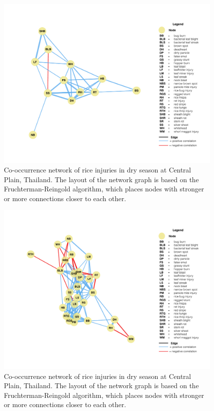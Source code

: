 \begin{figure}
    \centering
        \includegraphics[width = 1\textwidth]{figures/fullnetwork_TMws.pdf}
        \caption{Co-occurrence network of rice injuries in dry season at Central Plain, Thailand. The layout of the network graph is based on the Fruchterman-Reingold algorithm, which places nodes with stronger or more connections closer to each other.}
        \label{fig:}
    \end{figure}

\begin{figure}
    \centering
        \includegraphics[width = 1\textwidth]{figures/fullnetwork_WJds.pdf}
        \caption{Co-occurrence network of rice injuries in dry season at Central Plain, Thailand. The layout of the network graph is based on the Fruchterman-Reingold algorithm, which places nodes with stronger or more connections closer to each other.}
        \label{fig:fullnetwork_TMws}
    \end{figure}

